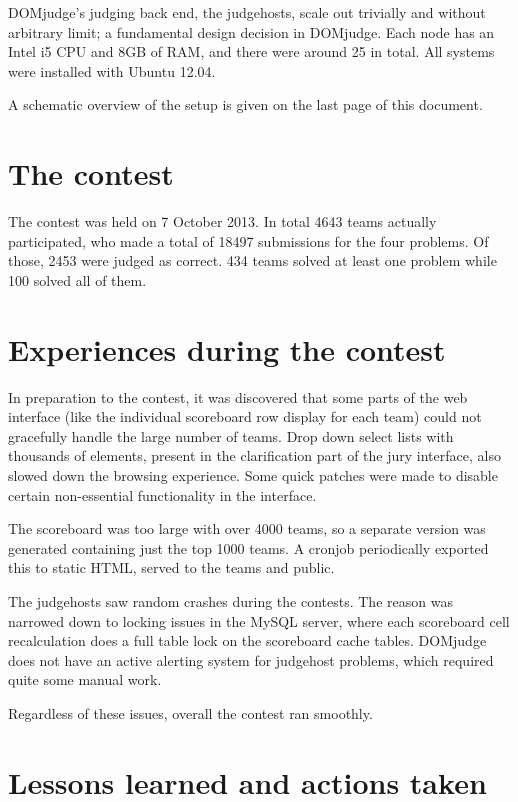 \documentclass[DIV=calc, paper=a4, fontsize=11pt, twocolumn]{scrartcl}	 %
\begin{document}
DOMjudge's judging back end, the judgehosts, scale out trivially and without
arbitrary limit; a fundamental design decision in DOMjudge. Each node has an
Intel i5 CPU and 8GB of RAM, and there were around 25 in total. All
systems were installed with Ubuntu 12.04.

A schematic overview of the setup is given on the last page of this document.

\section*{The contest}

The contest was held on 7 October 2013.  In total 4643 teams actually
participated, who made a total of 18497 submissions for the four problems.
Of those, 2453 were judged as correct. 434 teams solved at least one
problem while 100 solved all of them.

\section*{Experiences during the contest}

In preparation to the contest, it was discovered that some parts of
the web interface (like the individual scoreboard row display for each
team) could not gracefully handle the large number of teams. Drop down
select lists with thousands of elements, present in the clarification
part of the jury interface, also slowed down the browsing experience.
Some quick patches were made to disable certain non-essential
functionality in the interface.

The scoreboard was too large with over 4000 teams, so a separate
version was generated containing just the top 1000 teams. A cronjob
periodically exported this to static HTML, served to the teams and
public.

The judgehosts saw random crashes during the contests. The reason was narrowed
down to locking issues in the MySQL server, where each scoreboard cell
recalculation does a full table lock on the scoreboard cache tables.
DOMjudge does not have an active alerting system for judgehost problems,
which required quite some manual work.

Regardless of these issues, overall the contest ran smoothly.

\section*{Lessons learned and actions taken}
\end{document}
